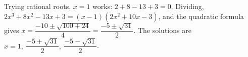 Trying rational roots, $x=1$ works: $2+8-13+3=0$. Dividing, $2x^3+8x^2-13x+3=(x-1)(2x^2+10x-3)$, and the quadratic formula gives $x=\dfrac{-10\pm\sqrt{100+24}}{4}=\dfrac{-5\pm\sqrt{31}}{2}$. The solutions are $\boxed{x=1,\ \dfrac{-5+\sqrt{31}}{2},\ \dfrac{-5-\sqrt{31}}{2}}$.
